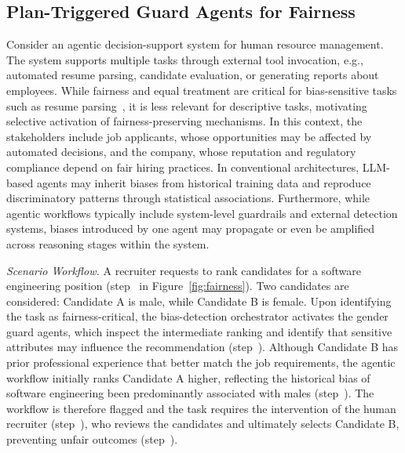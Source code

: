 \documentclass[sigconf,nonacm]{acmart}
\begin{document}
\subsection{Plan-Triggered Guard Agents for Fairness}
Consider an agentic decision-support system for human resource management.
The system supports multiple tasks through external tool invocation, e.g., automated resume parsing, candidate evaluation, or generating reports about employees.
While fairness and equal treatment are critical for bias-sensitive tasks such as resume parsing~\cite{dolci2023improving,bolukbasi2016man}, it is less relevant for descriptive tasks, motivating selective activation of fairness-preserving mechanisms.
In this context, the stakeholders include job applicants, whose opportunities may be affected by automated decisions, and the company, whose reputation and regulatory compliance depend on fair hiring practices.
In conventional architectures, LLM-based agents may inherit biases from historical training data and reproduce discriminatory patterns through statistical associations.
Furthermore, while agentic workflows typically include system-level guardrails and external detection systems, biases introduced by one agent may propagate or even be amplified across reasoning stages within the system.

\textit{Scenario Workflow.}
A recruiter requests to rank candidates for a software engineering position (step~ in Figure~\ref{fig:fairness}).
Two candidates are considered: Candidate A is male, while Candidate B is female.
Upon identifying the task as fairness-critical, the bias-detection orchestrator activates the gender guard agents, which inspect the intermediate ranking and identify that sensitive attributes may influence the recommendation (step~).
Although Candidate B has prior professional experience that better match the job requirements, the agentic workflow initially ranks Candidate A higher, reflecting the historical bias of software engineering been predominantly associated with males (step~).
The workflow is therefore flagged and the task requires the intervention of the human recruiter (step~), who reviews the candidates and ultimately selects Candidate B, preventing unfair outcomes (step~).
\end{document}

